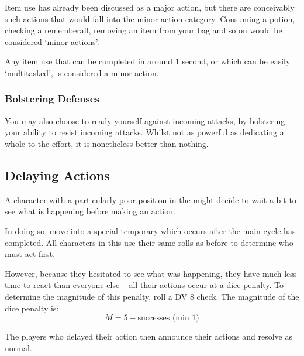 Item use has already been discussed as a major action, but there are conceivably such actions that would fall into the minor action category. Consuming a potion, checking a rememberall, removing an item from your bag and so on would be considered `minor actions'. 

Any item use that can be completed in around 1 second, or which can be easily `multitasked', is considered a minor action. 

\subsubsection{Bolstering Defenses}
 
 You may also choose to ready yourself against incoming attacks, by bolstering your ability to resist incoming attacks. Whilst not as powerful as dedicating a whole  to the effort, it is nonetheless better than nothing. 




\subsection{Delaying Actions}

A character with a particularly poor position in the  might decide to wait a bit to see what is happening before making an action. 

In doing so, move into a special temporary  which occurs after the main cycle has completed. All characters in this  use their same rolls as before to determine who must act first.

However, because they hesitated to see what was happening, they have much less time to react than everyone else -- all their actions occur at a dice penalty. To determine the magnitude of this penalty, roll a DV 8  check. The magnitude of the dice penalty is:
$$ M = 5 - \text{successes   (min 1)} $$

The players who delayed their action then announce their actions and resolve as normal. 


